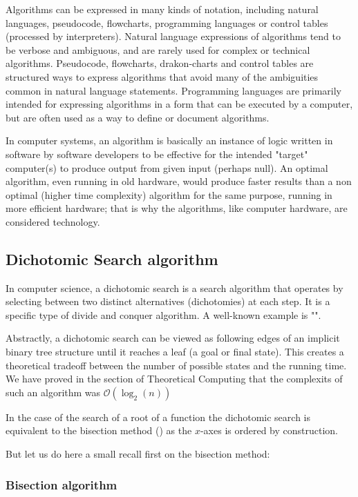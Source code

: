 	Algorithms can be expressed in many kinds of notation, including natural languages, pseudocode, flowcharts, programming languages or control tables (processed by interpreters). Natural language expressions of algorithms tend to be verbose and ambiguous, and are rarely used for complex or technical algorithms. Pseudocode, flowcharts, drakon-charts and control tables are structured ways to express algorithms that avoid many of the ambiguities common in natural language statements. Programming languages are primarily intended for expressing algorithms in a form that can be executed by a computer, but are often used as a way to define or document algorithms.

	In computer systems, an algorithm is basically an instance of logic written in software by software developers to be effective for the intended "target" computer(s) to produce output from given input (perhaps null). An optimal algorithm, even running in old hardware, would produce faster results than a non optimal (higher time complexity) algorithm for the same purpose, running in more efficient hardware; that is why the algorithms, like computer hardware, are considered technology.
	
	\subsection{Dichotomic Search algorithm}
	In computer science, a dichotomic search is a search algorithm that operates by selecting between two distinct alternatives (dichotomies) at each step. It is a specific type of divide and conquer algorithm. A well-known example is "".

	Abstractly, a dichotomic search can be viewed as following edges of an implicit binary tree structure until it reaches a leaf (a goal or final state). This creates a theoretical tradeoff between the number of possible states and the running time. We have proved in the section of Theoretical Computing that the complexits of such an algorithm was $\mathcal{O}(\log_2(n))$

	In the case of the search of a root of a function the dichotomic search is equivalent to the bisection method () as the $x$-axes is ordered by construction.
	
	But let us do here a small recall first on the bisection method:
	
	\subsubsection{Bisection algorithm}
	

